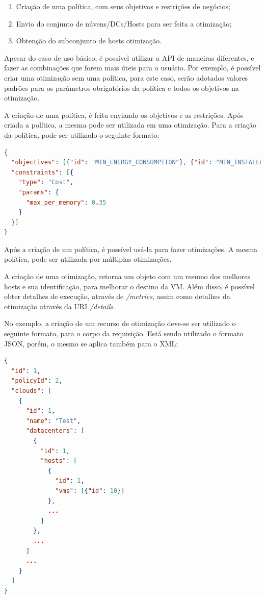 \begin{enumerate}
 \item Criação de uma política, com seus objetivos e restrições de negócios;
 \item Envio do conjunto de núvens/DCs/Hosts para ser feita a otimização;
 \item Obtenção do subconjunto de hosts otimização.
\end{enumerate}



Apesar do caso de uso básico, é possível utilizar a API de maneiras diferentes,
e fazer as combinações que forem mais úteis para o usuário. Por exemplo, é possível
criar uma otimização sem uma política, para este caso, serão adotados valores
padrões para os parâmetros obrigatórios da política e todos os objetivos na otimização.

A criação de uma política, é feita enviando os objetivos e as restrições.
Após criada a política, a mesma pode ser utilizada em uma otimização. Para a 
criação da política, pode ser utilizado o seguinte formato:

\begin{lstlisting}[language=json,firstnumber=1]
{
  "objectives": [{"id": "MIN_ENERGY_CONSUMPTION"}, {"id": "MIN_INSTALLATION_TIME"}],
  "constraints": [{
    "type": "Cost",
    "params": {
      "max_per_memory": 0.35
    }
  }]
}
\end{lstlisting}

Após a criação de um política, é possível usá-la para fazer otimizações. A mesma
política, pode ser utilizada por múltiplas otimizações.

A criação de uma otimização, retorna um objeto com um resumo dos melhores hosts
e sua identificação, para melhorar o destino da VM.
Além disso, é possível obter detalhes de execução, através de \textit{/metrics}, assim
como detalhes da otimização através da URI \textit{/details}.

No exemplo, a criação de um recurso de otimização deve-se ser utilizado o seguinte formato, 
para o corpo da requisição. Está sendo utilizado o formato JSON, porém, o mesmo se aplica 
também para o XML:

\begin{lstlisting}[language=json,firstnumber=1]
{
  "id": 1,
  "policyId": 2,
  "clouds": [
    {
      "id": 1,
      "name": "Test",
      "datacenters": [
        {
          "id": 1,
          "hosts": [
            {
              "id": 1,
              "vms": [{"id": 10}]
            },
            ...
          ]
        },
        ...
      ]
      ...
    }
  ]
}
\end{lstlisting}

